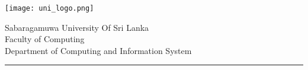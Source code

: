 \begin{titlepage}

  \begin{minipage}{0.3\textwidth}
      \texttt{[image: uni\_logo.png]}
  \end{minipage}
  \begin{minipage}{0.8\textwidth}
    \LARGE Sabaragamuwa University Of Sri Lanka \\
    \large Faculty of Computing \\
    Department of Computing and Information System \\
  \end{minipage}
\begin{center}
   \rule{510pt}{0.5em}
  \Large \course \\
  \vspace{1cm}
  \name \\ \indexnum
\end{center}
\end{titlepage}
